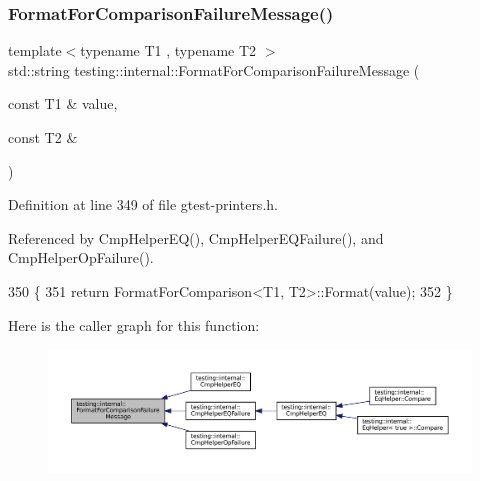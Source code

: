\subsubsection{\texorpdfstring{Format\+For\+Comparison\+Failure\+Message()}{FormatForComparisonFailureMessage()}}
{\footnotesize\ttfamily template$<$typename T1 , typename T2 $>$ \\
std\+::string testing\+::internal\+::\+Format\+For\+Comparison\+Failure\+Message (\begin{DoxyParamCaption}\item[{const T1 \&}]{value,  }\item[{const T2 \&}]{ }\end{DoxyParamCaption})}



Definition at line 349 of file gtest-\/printers.\+h.



Referenced by Cmp\+Helper\+E\+Q(), Cmp\+Helper\+E\+Q\+Failure(), and Cmp\+Helper\+Op\+Failure().


\begin{DoxyCode}
350                                   \{
351   \textcolor{keywordflow}{return} FormatForComparison<T1, T2>::Format(value);
352 \}
\end{DoxyCode}
Here is the caller graph for this function\+:
\nopagebreak
\begin{figure}[H]
\begin{center}
\leavevmode
\includegraphics[width=350pt]{namespacetesting_1_1internal_a91ab078f10adc669f09b7f604975c518_icgraph}
\end{center}
\end{figure}
\mbox{\label{namespacetesting_1_1internal_a593b52fcbb46a765a31850661b1960f4}} 
